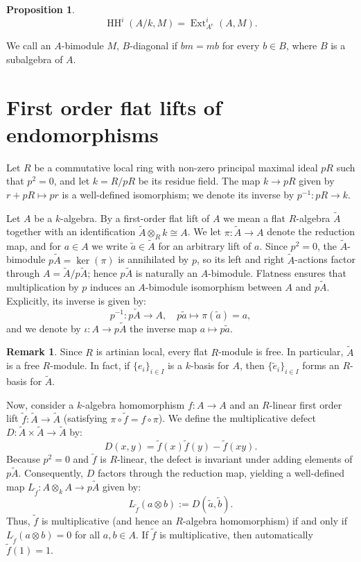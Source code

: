 \documentclass[a4paper,11pt,reqno]{amsart}%
\newtheorem{proposition}[theorem]{Proposition}
\theoremstyle{definition}
\newtheorem{remark}[theorem]{Remark}
\newcommand{\HH}{\operatorname{HH}}
\newcommand{\Ext}{\operatorname{Ext}}
\newcommand{\<}{\<}
\renewcommand{\>}{\>}
\newcommand{\lA}{\widetilde{A}}
\newcommand{\lf}{\widetilde{f}}
\numberwithin{equation}{subsection}
\begin{document}
\begin{proposition}
$$
\HH^i(A/k, M) = \Ext^i_{A^e}(A, M).
$$
\end{proposition}

We call an $A$-bimodule $M$, 
$B$-diagonal if $b m = m b$ for every $b\in B$, where $B$ is a subalgebra of $A$.

\section{First order flat lifts of endomorphisms}

Let $R$ be a commutative local ring with non-zero principal maximal ideal $pR$ such that $p^2 = 0$, and let $k = R/pR$ be its residue field. 
The map $k \to pR$ given by $r +p R \mapsto pr$ is a well-defined isomorphism; we denote its inverse by $p^{-1}: pR \to k$.

Let $A$ be a $k$-algebra. By a first-order flat lift of $A$ we mean a flat $R$-algebra $\lA$ together with an identification
$\lA\otimes_R k \cong A$. We let $\pi:\lA\rightarrow A$ denote the reduction map, and for $a\in A$ we write $\tilde a\in \lA$ for an arbitrary lift of $a$.
Since $p^2=0$, the $\lA$-bimodule $p\lA=\ker(\pi)$ is annihilated by $p$, so its left and right $\lA$-actions factor through $A=\lA/p\lA$; hence $p\lA$ is naturally an $A$-bimodule.
Flatness ensures that multiplication by $p$ 
induces an $A$-bimodule isomorphism between $A$ and $p\lA$. Explicitly, its inverse is given by:
$$
p^{-1}: p\lA \longrightarrow A, \quad p \tilde{a} \longmapsto \pi(\tilde{a}) = a,
$$
and we denote by $\iota: A \to p\lA$ the inverse map $a \mapsto p\tilde{a}$.


\begin{remark}
Since $R$ is artinian local, every flat $R$-module is free. In particular, $\lA$ is a free $R$-module. 
In fact, if $\{e_i\}_{i \in I}$ is a $k$-basis for $A$, then $\{\tilde{e}_i\}_{i \in I}$ forms an $R$-basis for $\lA$.
\end{remark}

Now, consider a $k$-algebra homomorphism $f: A \to A$ and an $R$-linear first order lift $\lf: \lA \to \lA$ (satisfying $\pi \circ \lf = f \circ \pi$). 
We define the multiplicative defect $D: \lA \times \lA \to \lA$ by:
$$
D(x, y) = \lf(x) \lf(y) - \lf(xy).
$$
Because $p^2 = 0$ and $\lf$ is $R$-linear, the defect is invariant under adding elements of $p\lA$. 
Consequently, $D$ factors through the reduction map, yielding a well-defined map $L_{\lf}: A \otimes_k A \to p\lA$ given by:
$$
L_{\lf}(a \otimes b) := D(\tilde{a}, \tilde{b}).
$$
Thus, $\lf$ is multiplicative (and hence an $R$-algebra homomorphism) if and only if $L_{\lf}(a \otimes b) = 0$ for all $a, b \in A$.
If $\lf$ is multiplicative, then automatically $\lf(1) = 1$.
\end{document}

